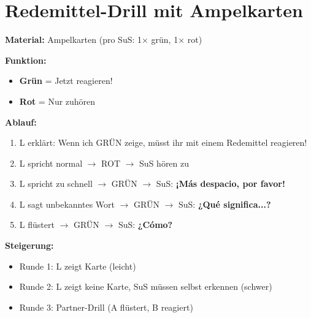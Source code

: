 \documentclass[11pt,a4paper]{article}
\newcommand{\es}[1]{\textbf{#1}}
\begin{document}
\vspace{0.5cm}

\section*{Redemittel-Drill mit Ampelkarten}

\begin{tcolorbox}[colback=white, colframe=fach, title=\textcolor{white}{\textbf{Así se dice -- Drill (10 Min.)}}]

\textbf{Material:} Ampelkarten (pro SuS: 1× grün, 1× rot)

\vspace{0.3cm}

\textbf{Funktion:}
\begin{itemize}[nosep]
    \item \textbf{Grün} = Jetzt reagieren!
    \item \textbf{Rot} = Nur zuhören
\end{itemize}

\vspace{0.3cm}

\textbf{Ablauf:}
\begin{enumerate}[nosep]
    \item L erklärt: \glqq Wenn ich GRÜN zeige, müsst ihr mit einem Redemittel reagieren!\grqq
    \item L spricht normal $\rightarrow$ ROT $\rightarrow$ SuS hören zu
    \item L spricht zu schnell $\rightarrow$ GRÜN $\rightarrow$ SuS: \es{¡Más despacio, por favor!}
    \item L sagt unbekanntes Wort $\rightarrow$ GRÜN $\rightarrow$ SuS: \es{¿Qué significa...?}
    \item L flüstert $\rightarrow$ GRÜN $\rightarrow$ SuS: \es{¿Cómo?}
\end{enumerate}

\vspace{0.3cm}

\textbf{Steigerung:}
\begin{itemize}[nosep]
    \item Runde 1: L zeigt Karte (leicht)
    \item Runde 2: L zeigt keine Karte, SuS müssen selbst erkennen (schwer)
    \item Runde 3: Partner-Drill (A flüstert, B reagiert)
\end{itemize}

\end{tcolorbox}
\end{document}
